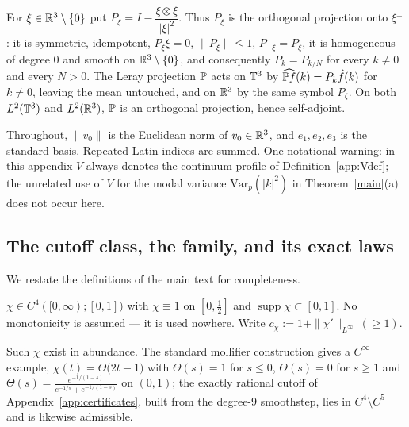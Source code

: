 For $\xi\in\mathbb R^3\setminus\{0\}$ put
$P_\xi=I-\dfrac{\xi\otimes\xi}{|\xi|^2}$. Thus $P_\xi$ is the orthogonal
projection onto $\xi^\perp$: it is symmetric, idempotent, $P_\xi\xi=0$,
$\|P_\xi\|\le1$, $P_{-\xi}=P_\xi$, it is homogeneous of degree $0$ and
smooth on $\mathbb R^3\setminus\{0\}$, and consequently
$P_{k}=P_{k/N}$ for every $k\neq0$ and every $N>0$. The Leray
projection $\mathbb P$ acts on $\mathbb T^3$ by
$\widehat{\mathbb P f}(k)=P_k\hat f(k)$ for $k\neq0$, leaving the mean
untouched, and on $\mathbb R^3$ by the same symbol $P_\zeta$. On both
$L^2(\mathbb T^3)$ and $L^2(\mathbb R^3)$, $\mathbb P$ is an orthogonal projection, hence
self-adjoint.

Throughout, $\|v_0\|$ is the Euclidean norm of $v_0\in\mathbb R^3$, and
$e_1,e_2,e_3$ is the standard basis. Repeated Latin indices are summed.
One notational warning: in this appendix $V$ always denotes the
continuum profile of Definition~\ref{app:Vdef}; the unrelated use of
$V$ for the modal variance $\mathrm{Var}_p(|k|^2)$ in
Theorem~\ref{main}(a) does not occur here.

\subsection{The cutoff class, the family, and its exact laws}
\label{app:laws}

We restate the definitions of the main text for completeness.

\begin{definition}\label{app:admissible}
$\chi\in C^4([0,\infty);[0,1])$ with $\chi\equiv1$ on
$[0,\tfrac12]$ and $\operatorname{supp}\chi\subset[0,1]$. No
monotonicity is assumed --- it is used nowhere. Write
$c_\chi:=1+\|\chi'\|_{L^\infty}\ (\ge1)$.
\end{definition}

Such $\chi$ exist in abundance. The standard mollifier construction
gives a $C^\infty$ example, $\chi(t)=\Theta\big(2t-1\big)$ with
$\Theta(s)=1$ for $s\le0$, $\Theta(s)=0$ for $s\ge1$ and
$\Theta(s)=\frac{e^{-1/(1-s)}}{e^{-1/s}+e^{-1/(1-s)}}$ on $(0,1)$; the
exactly rational cutoff of Appendix~\ref{app:certificates}, built from
the degree-$9$ smoothstep, lies in $C^4\setminus C^5$ and is likewise
admissible.

